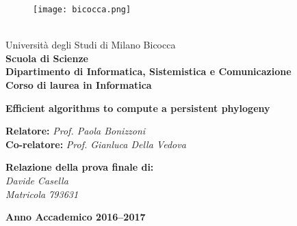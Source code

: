 
\begin{titlepage}

  \begin{spacing}{1.48}
    \begin{wrapfigure}[5]{l}[20mm]{0.2\linewidth}
      \texttt{[image: bicocca.png]}
    \end{wrapfigure}
    \text{} \\[-0.027\textheight]
    Università degli Studi di Milano Bicocca \\
    \textbf{Scuola di Scienze} \\
    \textbf{Dipartimento di Informatica, Sistemistica e Comunicazione} \\
    \textbf{Corso di laurea in Informatica}
  \end{spacing}

  \vfill

  \begin{spacing}{2}
    \begin{center}
      {\huge \textbf{Efficient algorithms to compute a persistent phylogeny}}
    \end{center}
  \end{spacing}

  \vfill

  \begin{onehalfspace}
    \begin{flushleft}
      {\large
        \textbf{Relatore:} \textit{Prof. Paola Bonizzoni} \\
        \textbf{Co-relatore:} \textit{Prof. Gianluca Della Vedova}
      }
    \end{flushleft}
  \end{onehalfspace}

  \vfill

  \begin{onehalfspace}
    \begin{flushright}
      {\large
        \textbf{Relazione della prova finale di:} \\
        \textit{Davide Casella} \\
        \textit{Matricola 793631}
      }
    \end{flushright}
  \end{onehalfspace}

  \vfill

  \begin{center}
    {\large \textbf{Anno Accademico 2016--2017}}
  \end{center}

\end{titlepage}
